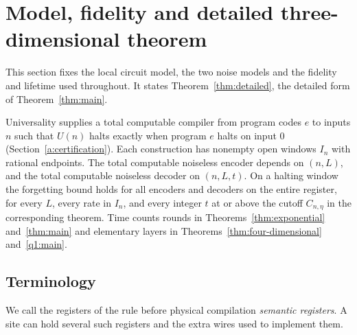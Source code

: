 \section{Model, fidelity and detailed three-dimensional theorem}\label{s:model}
This section fixes the local circuit model, the two noise models and the fidelity and lifetime used throughout. It states Theorem~\ref{thm:detailed}, the detailed form of Theorem~\ref{thm:main}.

Universality supplies a total computable compiler from program codes \(e\) to inputs \(n\) such that \(U(n)\) halts exactly when program \(e\) halts on input \(0\) (Section~\ref{a:certification}). Each construction has nonempty open windows \(I_n\) with rational endpoints. The total computable noiseless encoder depends on \((n,L)\), and the total computable noiseless decoder on \((n,L,t)\). On a halting window the forgetting bound holds for all encoders and decoders on the entire register, for every \(L\), every rate in \(I_n\), and every integer \(t\) at or above the cutoff \(C_{n,\eta}\) in the corresponding theorem. Time counts rounds in Theorems~\ref{thm:exponential} and~\ref{thm:main} and elementary layers in Theorems~\ref{thm:four-dimensional} and~\ref{q1:main}.

\subsection{Terminology}
We call the registers of the rule before physical compilation \emph{semantic registers}. A site can hold several such registers and the extra wires used to implement them.

